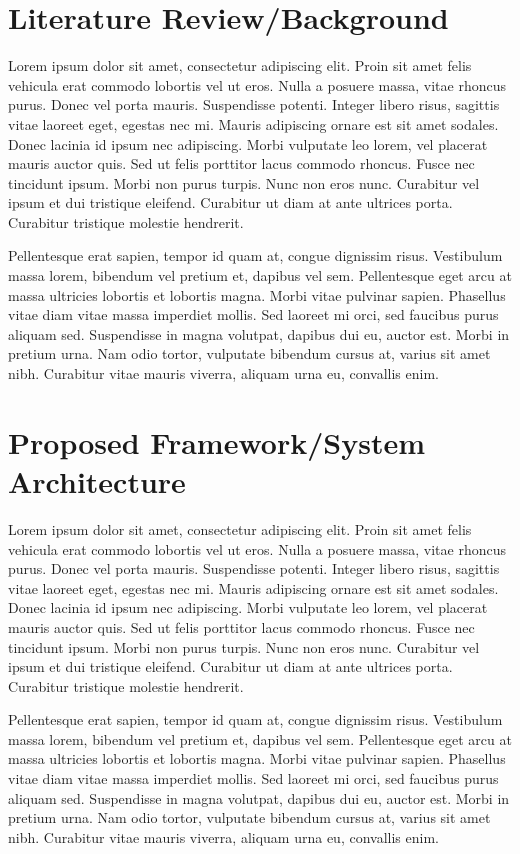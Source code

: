\documentclass{vitmsprojectreport}
\begin{document}
\chapter{Literature Review/Background}

Lorem ipsum dolor sit amet, consectetur adipiscing elit. Proin sit amet felis vehicula erat commodo lobortis vel ut eros. Nulla a posuere massa, vitae rhoncus purus. Donec vel porta mauris. Suspendisse potenti. Integer libero risus, sagittis vitae laoreet eget, egestas nec mi. Mauris adipiscing ornare est sit amet sodales. Donec lacinia id ipsum nec adipiscing. Morbi vulputate leo lorem, vel placerat mauris auctor quis. Sed ut felis porttitor lacus commodo rhoncus. Fusce nec tincidunt ipsum. Morbi non purus turpis. Nunc non eros nunc. Curabitur vel ipsum et dui tristique eleifend. Curabitur ut diam at ante ultrices porta. Curabitur tristique molestie hendrerit.

Pellentesque erat sapien, tempor id quam at, congue dignissim risus. Vestibulum massa lorem, bibendum vel pretium et, dapibus vel sem. Pellentesque eget arcu at massa ultricies lobortis et lobortis magna. Morbi vitae pulvinar sapien. Phasellus vitae diam vitae massa imperdiet mollis. Sed laoreet mi orci, sed faucibus purus aliquam sed. Suspendisse in magna volutpat, dapibus dui eu, auctor est. Morbi in pretium urna. Nam odio tortor, vulputate bibendum cursus at, varius sit amet nibh. Curabitur vitae mauris viverra, aliquam urna eu, convallis enim.

\chapter{Proposed Framework/System Architecture}

Lorem ipsum dolor sit amet, consectetur adipiscing elit. Proin sit amet felis vehicula erat commodo lobortis vel ut eros. Nulla a posuere massa, vitae rhoncus purus. Donec vel porta mauris. Suspendisse potenti. Integer libero risus, sagittis vitae laoreet eget, egestas nec mi. Mauris adipiscing ornare est sit amet sodales. Donec lacinia id ipsum nec adipiscing. Morbi vulputate leo lorem, vel placerat mauris auctor quis. Sed ut felis porttitor lacus commodo rhoncus. Fusce nec tincidunt ipsum. Morbi non purus turpis. Nunc non eros nunc. Curabitur vel ipsum et dui tristique eleifend. Curabitur ut diam at ante ultrices porta. Curabitur tristique molestie hendrerit.

Pellentesque erat sapien, tempor id quam at, congue dignissim risus. Vestibulum massa lorem, bibendum vel pretium et, dapibus vel sem. Pellentesque eget arcu at massa ultricies lobortis et lobortis magna. Morbi vitae pulvinar sapien. Phasellus vitae diam vitae massa imperdiet mollis. Sed laoreet mi orci, sed faucibus purus aliquam sed. Suspendisse in magna volutpat, dapibus dui eu, auctor est. Morbi in pretium urna. Nam odio tortor, vulputate bibendum cursus at, varius sit amet nibh. Curabitur vitae mauris viverra, aliquam urna eu, convallis enim.
\end{document}
